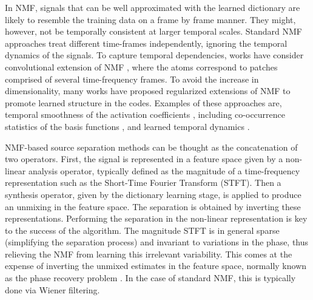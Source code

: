 In NMF, signals that can be well approximated with the learned dictionary are
likely to resemble the training data on a frame by frame manner. They might, however, 
not be temporally consistent at larger temporal scales.
 Standard NMF approaches treat different time-frames independently, ignoring the 
temporal dynamics of the signals. 
To capture temporal dependencies,  
works have consider convolutional extension of NMF \cite{smaragdis2007convolutive}, where the atoms
correspond to patches comprised of several time-frequency frames. 
To avoid the increase in dimensionality, many works have proposed regularized extensions of NMF to promote learned structure in the codes. 
Examples of these approaches are, temporal smoothness of the activation coefficients \cite{fevotte2011majorization}, including  co-occurrence statistics of the basis functions \cite{WilsonRSD08}, and learned temporal dynamics \cite{MysoreS11,HanMP12,icassp13a}.

NMF-based source separation methods can be thought as the concatenation of two operators.
First, the signal is represented in a feature space given by a non-linear analysis operator, 
typically defined as the magnitude of a time-frequency representation such
as the Short-Time Fourier Transform (STFT). 
Then a synthesis operator, given by the dictionary learning stage, is applied to produce an unmixing in the feature space.
 The separation is obtained by inverting these representations. 
Performing the separation in the non-linear representation is key to the success of the algorithm. The magnitude STFT is in general sparse (simplifying the separation process) and invariant to variations in the phase, thus relieving the NMF from
learning this irrelevant variability. 
This comes at the expense of inverting the unmixed estimates in the feature space, normally known as the
phase recovery problem \cite{yonina}. In the case of standard NMF, this is 
typically done via Wiener filtering. 

